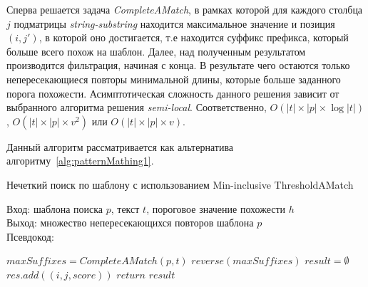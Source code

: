 Сперва решается задача \emph{CompleteAMatch}, в рамках которой для каждого столбца $j$ подматрицы \emph{string-substring} находится максимальное значение и позиция $(i,j')$, в которой оно  достигается, т.е находится суффикс префикса, который больше всего похож на шаблон.
Далее, над полученным результатом производится фильтрация, начиная с конца.
В результате чего остаются только непересекающиеся повторы минимальной длины, которые больше заданного порога похожести.
Асимптотическая сложность данного решения зависит от выбранного алгоритма  решения \emph{semi-local}.
Соответственно, $O(|t| \times |p| \times \log |t|)$, $O(|t| \times |p| \times v^2)$ или $O(|t| \times |p| \times v)$.

Данный алгоритм рассматривается как альтернатива алгоритму~\ref{alg:patternMathing1}.

\begin{algorithm}[b!]
\caption{Нечеткий поиск по шаблону с использованием Min-inclusive ThresholdAMatch}\label{alg:patternMathing2}
Вход: шаблона поиска $p$, текст $t$, пороговое значение похожести $h$\\
Выход: множество непересекающихся повторов шаблона $p$\\
Псевдокод:
\begin{algorithmic}[1]
\State $maxSuffixes= CompleteAMatch(p,t)$
\State $reverse(maxSuffixes)$
\State $result = \emptyset$
    \State $res.add((i,j,score))$ 
    \EndIf
\EndFor
\State $return$ $result$

\end{algorithmic}
\end{algorithm}


